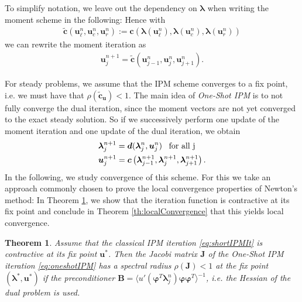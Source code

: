 \documentclass[10pt, a4paper, titlepage, bibliography=totocnumbered]{article}
\newtheorem{theorem}{Theorem}[section]
\begin{document}
To simplify notation, we leave out the dependency on $\bm{\lambda}$ when writing the moment scheme in the following: Hence with 
\begin{align*}
\bm{\tilde c}\left(\bm{u}_{\ell}^n,\bm{u}_{c}^n,\bm{u}_{r}^n\right):=\bm{c}\left(\bm{\lambda}(\bm{u}_{\ell}^n),\bm{\lambda}(\bm{u}_{c}^n),\bm{\lambda}(\bm{u}_{r}^n)\right)
\end{align*}
we can rewrite the moment iteration as
\begin{align}\label{eq:shortIPMIt}
\bm{u}_j^{n+1} = \bm{\tilde c}\left(\bm{u}_{j-1}^n,\bm{u}_{j}^n,\bm{u}_{j+1}^n\right).
\end{align}

For steady problems, we assume that the IPM scheme converges to a fix point, i.e. we must have that $\rho (\bm{\tilde c}_{\bm{u}})<1$. The main idea of \textit{One-Shot IPM} is to not fully converge the dual iteration, since the moment vectors are not yet converged to the exact steady solution. So if we successively perform one update of the moment iteration and one update of the dual iteration, we obtain 
\begin{subequations}\label{eq:oneshotIPM}
\begin{align}
&\bm{\lambda}_{j}^{n+1} =  \bm{d}(\bm{\lambda}_j^{n},\bm{u}_j^{n}) \enskip \text{ for all j} \label{eq:oneshotIPMdual}\\
&\bm{u}_j^{n+1} =  \bm{c}\left(\bm{\lambda}_{j-1}^{n+1},\bm{\lambda}_{j}^{n+1},\bm{\lambda}_{j+1}^{n+1}\right)\label{eq:oneshotIPMmoment}.
\end{align}
\end{subequations}
In the following, we study convergence of this scheme. For this we take an approach commonly chosen to prove the local convergence properties of Newton's method: In Theorem \ref{th:Contractive}, we show that the iteration function is contractive at its fix point and conclude in Theorem \ref{th:localConvergence} that this yields local convergence.
\begin{theorem}\label{th:Contractive}
Assume that the classical IPM iteration \eqref{eq:shortIPMIt} is contractive at its fix point $\bm{u}^*$. Then the Jacobi matrix $\bm{J}$ of the One-Shot IPM iteration \eqref{eq:oneshotIPM} has a spectral radius $\rho(\bm{J})<1$ at the fix point $(\bm{\lambda}^*,\bm{u}^*)$ if the preconditioner $\bm{B} = \langle u'(\bm{\varphi}^T\bm{\lambda}_j^{n})\bm{\varphi}\bm{\varphi}^T\rangle^{-1}$, i.e. the Hessian of the dual problem is used.
\end{theorem}
\end{document}
